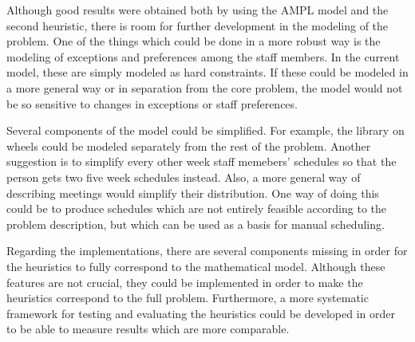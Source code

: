 Although good results were obtained both by using the AMPL model and the second heuristic, there is room for further development in the modeling of the problem. One of the things which could be done in a more robust way is the modeling of exceptions and preferences among the staff members. In the current model, these are simply modeled as hard constraints. If these could be modeled in a more general way or in separation from the core problem, the model would not be so sensitive to changes in exceptions or staff preferences.


Several components of the model could be simplified. For example, the library on wheels could be modeled separately from the rest of the problem. Another suggestion is to simplify every other week staff memebers' schedules so that the person gets two five week schedules instead. Also, a more general way of describing meetings would simplify their distribution. One way of doing this could be to produce schedules which are not entirely feasible according to the problem description, but which can be used as a basis for manual scheduling.

Regarding the implementations, there are several components missing in order for the heuristics to fully correspond to the mathematical model. Although these features are not crucial, they could be implemented in order to make the heuristics correspond to the full problem. Furthermore, a more systematic framework for testing and evaluating the heuristics could be developed in order to be able to measure results which are more comparable.

